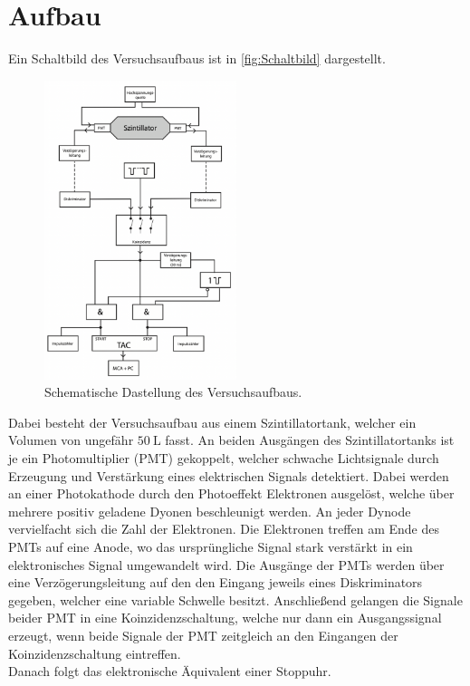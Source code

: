 \section{Aufbau}
\label{sec:Aufbau}
Ein Schaltbild des Versuchsaufbaus ist in \autoref{fig:Schaltbild} dargestellt. 
\begin{figure}[H]
    \centering
    \includegraphics[width=0.5\textwidth]{Abbildungen/Schaltung.png}
    \caption {Schematische Dastellung des Versuchsaufbaus.\cite{V01}}
    \label{fig:Schaltbild}
\end{figure}
Dabei besteht der Versuchsaufbau aus einem Szintillatortank, welcher ein Volumen von ungefähr $\qty{50}{\liter}$ fasst.
An beiden Ausgängen des Szintillatortanks ist je ein Photomultiplier (PMT) gekoppelt, welcher schwache Lichtsignale durch Erzeugung und Verstärkung eines elektrischen Signals detektiert.
Dabei werden an einer Photokathode durch den Photoeffekt Elektronen ausgelöst, welche über mehrere positiv geladene Dyonen beschleunigt werden.
An jeder Dynode vervielfacht sich die Zahl der Elektronen. Die Elektronen treffen am Ende des PMTs auf eine Anode, wo das ursprüngliche
Signal stark verstärkt in ein elektronisches Signal umgewandelt wird.
Die Ausgänge der PMTs werden über eine Verzögerungsleitung auf den den Eingang jeweils eines Diskriminators gegeben, welcher eine variable Schwelle besitzt. 
Anschließend gelangen die Signale beider PMT in eine Koinzidenzschaltung, welche nur dann ein Ausgangssignal erzeugt, wenn beide Signale der PMT zeitgleich an den Eingangen der Koinzidenzschaltung
eintreffen.\\
Danach folgt das elektronische Äquivalent einer Stoppuhr.
